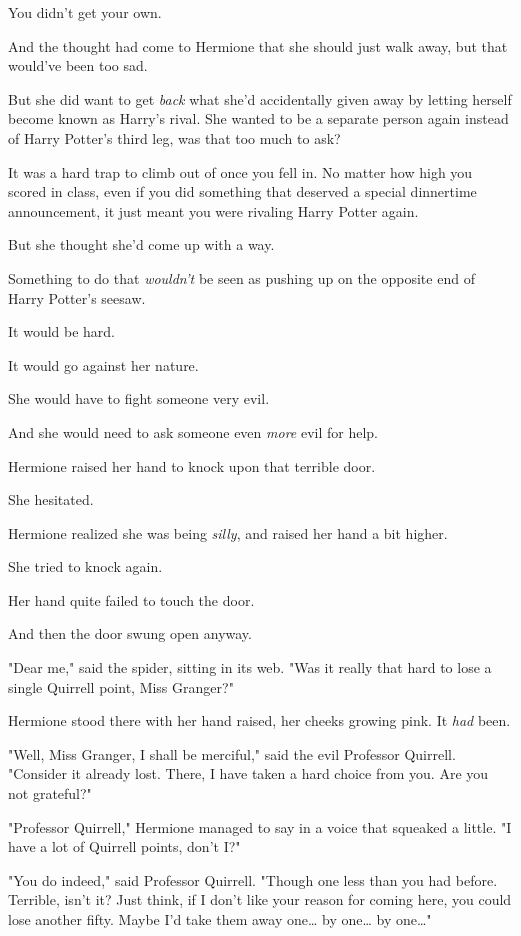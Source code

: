 You didn't get your own.

And the thought had come to Hermione that she should just walk away, but that 
would've been too sad.

But she did want to get \emph{back} what she'd accidentally given away by 
letting herself become known as Harry's rival. She wanted to be a separate 
person again instead of Harry Potter's third leg, was that too much to ask?

It was a hard trap to climb out of once you fell in. No matter how high you 
scored in class, even if you did something that deserved a special dinnertime 
announcement, it just meant you were rivaling Harry Potter again.

But she thought she'd come up with a way.

Something to do that \emph{wouldn't} be seen as pushing up on the opposite end 
of Harry Potter's seesaw.

It would be hard.

It would go against her nature.

She would have to fight someone very evil.

And she would need to ask someone even \emph{more} evil for help.

Hermione raised her hand to knock upon that terrible door.

She hesitated.

Hermione realized she was being \emph{silly}, and raised her hand a bit higher.

She tried to knock again.

Her hand quite failed to touch the door.

And then the door swung open anyway.

"Dear me," said the spider, sitting in its web. "Was it really that hard to 
lose a single Quirrell point, Miss Granger?"

Hermione stood there with her hand raised, her cheeks growing pink. It 
\emph{had} been.

"Well, Miss Granger, I shall be merciful," said the evil Professor Quirrell. 
"Consider it already lost. There, I have taken a hard choice from you. Are you 
not grateful?"

"Professor Quirrell," Hermione managed to say in a voice that squeaked a 
little. "I have a lot of Quirrell points, don't I?"

"You do indeed," said Professor Quirrell. "Though one less than you had before. 
Terrible, isn't it? Just think, if I don't like your reason for coming here, 
you could lose another fifty. Maybe I'd take them away one{\ldots} by 
one{\ldots} by one{\ldots}"

